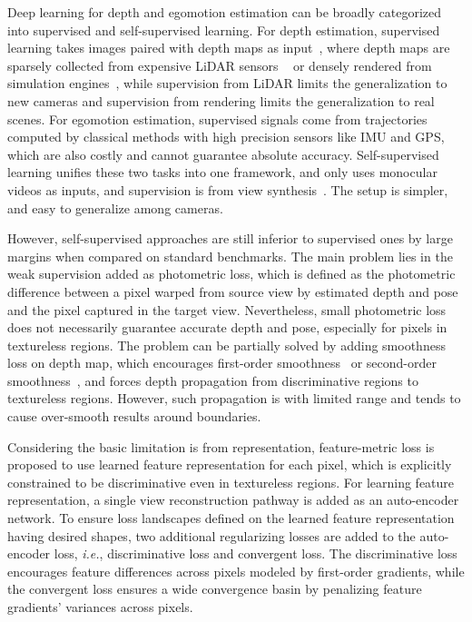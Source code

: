 \documentclass[runningheads]{llncs}
\def\ie{\emph{i.e.}}
\begin{document}
Deep learning for depth and egomotion estimation can be broadly categorized into supervised and self-supervised learning. 
For depth estimation, supervised learning takes images paired with depth maps as input~\cite{Eigen,dorn,bts}, where depth maps are sparsely collected from expensive LiDAR sensors ~\cite{kitti} or densely rendered from simulation engines~\cite{mayer2016large}, while supervision from LiDAR limits the generalization to new cameras and supervision from rendering limits the generalization to real scenes. 
For egomotion estimation, supervised signals come from trajectories computed by classical methods with high precision sensors like IMU and GPS, which are also costly and cannot guarantee absolute accuracy. 
Self-supervised learning unifies these two tasks into one framework, and only uses monocular videos as inputs, and supervision is from view synthesis~\cite{sfmlearner,GeoNet,vid2deep,monodepth,monodepth2}. 
The setup is simpler, and easy to generalize among cameras.

However, self-supervised approaches are still inferior to supervised ones by large margins when compared on standard benchmarks. 
The main problem lies in the weak supervision added as photometric loss, which is defined as the photometric difference between a pixel warped from source view by estimated depth and pose and the pixel captured in the target view. 
Nevertheless, small photometric loss does not necessarily guarantee accurate depth and pose, especially for pixels in textureless regions. 
The problem can be partially solved by adding smoothness loss on depth map, which encourages first-order smoothness~\cite{struct2depth,monodepth,monodepth2} or second-order smoothness~\cite{lego,dnc,epc,epc++}, and forces depth propagation from discriminative regions to textureless regions. 
However, such propagation is with limited range and tends to cause over-smooth results around boundaries.

Considering the basic limitation is from representation, feature-metric loss is proposed to use learned feature representation for each pixel, which is explicitly constrained to be discriminative even in textureless regions. For learning feature representation, a single view reconstruction pathway is added as an auto-encoder network. To ensure loss landscapes defined on the learned feature representation having desired shapes, two additional regularizing losses are added to the auto-encoder loss, \ie, discriminative loss and convergent loss. The discriminative loss encourages feature differences across pixels modeled by first-order gradients, while the convergent loss ensures a wide convergence basin by penalizing feature gradients' variances across pixels.
\end{document}
